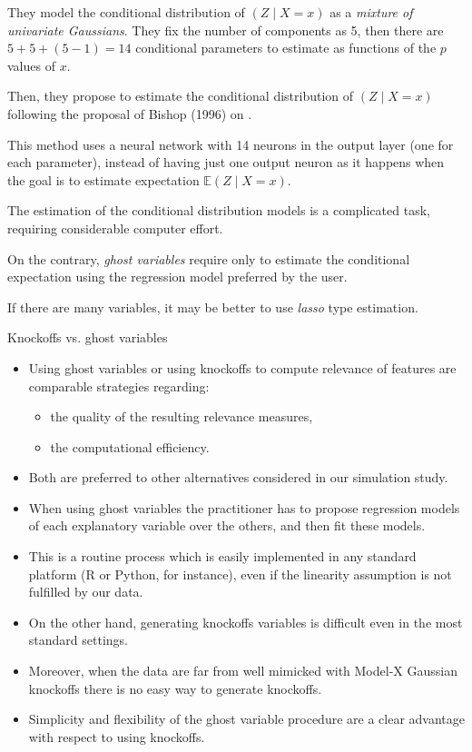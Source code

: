 They model the conditional distribution of $(Z \mid X = x)$
as a \emph{mixture of univariate Gaussians}. They fix the
number of components as 5, then there are
$ 5 + 5  + (5 - 1) = 14$ conditional
parameters to estimate as functions of the $p$ values
of $x$.

Then, they propose to estimate the conditional distribution
of $(Z \mid X = x)$ following the proposal of Bishop (1996)
on .

This method uses a neural network with 14 neurons in the
output layer (one for each parameter), instead of having
just one output neuron as it happens when the goal is
to estimate expectation $\mathds{E}(Z \mid X = x)$.

\begin{note}
	The estimation of the conditional distribution models
	is a complicated task, requiring considerable computer effort.

	On the contrary, \emph{ghost variables} require only
	to estimate the conditional expectation using the regression model
	preferred by the user.

	If there are many variables, it may be better to use \emph{lasso}
	type estimation.
\end{note}

\begin{recap}{Knockoffs vs. ghost variables}{}
	\begin{itemize}
		\item Using ghost variables or using knockoffs to compute relevance of
		      features are comparable strategies regarding:
		      \begin{itemize}
			      \item the quality of the resulting relevance measures,
			      \item the computational efficiency.
		      \end{itemize}
		\item Both are preferred to other alternatives considered in our simulation
		      study.
		\item When using ghost variables the practitioner has to propose
		      regression models of each explanatory variable over the others, and
		      then fit these models.
		\item This is a routine process which is easily implemented in any standard
		      platform (R or Python, for instance), even if the linearity assumption
		      is not fulfilled by our data.
		\item On the other hand, generating knockoffs variables is difficult even in
		      the most standard settings.
		\item Moreover, when the data are far from well mimicked with Model-X
		      Gaussian knockoffs there is no easy way to generate knockoffs.
		\item Simplicity and flexibility of the ghost variable procedure are a clear
		      advantage with respect to using knockoffs.
	\end{itemize}
\end{recap}

